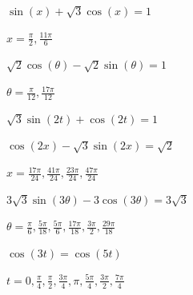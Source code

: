 \documentclass{ximera}
\begin{document}
\begin{question}
\begin{problem}
$\sin(x) + \sqrt{3} \cos(x) = 1$

\begin{solution}
$x = \frac{\pi}{2}, \frac{11\pi}{6}$
\end{solution}
\end{problem}

\begin{problem}
$\sqrt{2} \cos(\theta) - \sqrt{2} \sin(\theta) = 1$

\begin{solution}
$\theta = \frac{\pi}{12}, \frac{17\pi}{12}$
\end{solution}
\end{problem}

\begin{problem}
$\sqrt{3} \sin(2t) +  \cos(2t) = 1$

\begin{selectAll}
  \end{selectAll}
\end{problem}

\begin{problem}
 $\cos(2x) - \sqrt{3} \sin(2x) = \sqrt{2}$

\begin{solution}
$x = \frac{17 \pi}{24}, \frac{41 \pi}{24}, \frac{23\pi}{24}, \frac{47\pi}{24}$
\end{solution}
\end{problem}
 
\begin{problem}
$3\sqrt{3}\sin(3\theta) - 3\cos(3\theta) = 3\sqrt{3}$

\begin{solution}
$\theta = \frac{\pi}{6}, \frac{5\pi}{18}, \frac{5\pi}{6}, \frac{17\pi}{18}, \frac{3\pi}{2}, \frac{29\pi}{18}$
\end{solution}
\end{problem}

\begin{problem}
$\cos(3t) = \cos(5t)$

\begin{solution}
$t = 0, \frac{\pi}{4}, \frac{\pi}{2}, \frac{3\pi}{4}, \pi, \frac{5\pi}{4}, \frac{3\pi}{2}, \frac{7\pi}{4}$
\end{solution}
\end{problem}


\end{question}
\end{document}
